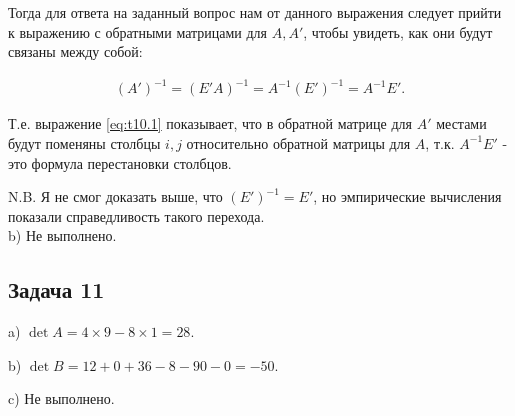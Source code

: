 \documentclass[a4paper,11pt]{article}
\begin{document}
Тогда для ответа на заданный вопрос нам от данного выражения следует прийти к выражению с обратными матрицами для $A, A'$, чтобы увидеть, как они будут связаны между собой:

\begin{align}
  \label{eq:t10.1}
  (A')^{-1} = (E'A)^{-1} = A^{-1}(E')^{-1} = A^{-1}E'.
\end{align}

Т.е. выражение \ref{eq:t10.1} показывает, что в обратной матрице для $A'$ местами будут поменяны столбцы $i,j$ относительно обратной матрицы для $A$, т.к. $A^{-1}E'$ - это формула перестановки столбцов.

N.B. Я не смог доказать выше, что $(E')^{-1} = E'$, но эмпирические вычисления показали справедливость такого перехода.\\

b) Не выполнено.

\subsection{Задача 11}

a) $\det A = 4 \times 9 - 8 \times 1 = 28$.

b) $\det B = 12 + 0 + 36 - 8 - 90 - 0 = -50$.

c) Не выполнено.
\end{document}
